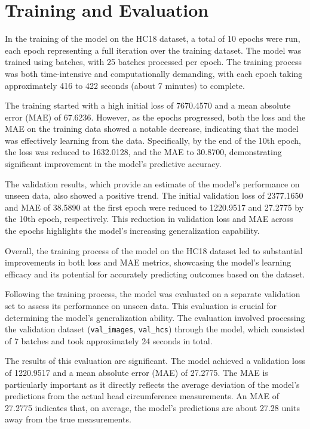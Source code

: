 \documentclass[twocolumn]{article}
\begin{document}
\section{Training and Evaluation}
In the training of the model on the HC18 dataset, a total of 10 epochs were run, each epoch representing a full iteration over the training dataset. The model was trained using batches, with 25 batches processed per epoch. The training process was both time-intensive and computationally demanding, with each epoch taking approximately 416 to 422 seconds (about 7 minutes) to complete.

The training started with a high initial loss of 7670.4570 and a mean absolute error (MAE) of 67.6236. However, as the epochs progressed, both the loss and the MAE on the training data showed a notable decrease, indicating that the model was effectively learning from the data. Specifically, by the end of the 10th epoch, the loss was reduced to 1632.0128, and the MAE to 30.8700, demonstrating significant improvement in the model's predictive accuracy.

The validation results, which provide an estimate of the model's performance on unseen data, also showed a positive trend. The initial validation loss of 2377.1650 and MAE of 38.5890 at the first epoch were reduced to 1220.9517 and 27.2775 by the 10th epoch, respectively. This reduction in validation loss and MAE across the epochs highlights the model's increasing generalization capability.

Overall, the training process of the model on the HC18 dataset led to substantial improvements in both loss and MAE metrics, showcasing the model's learning efficacy and its potential for accurately predicting outcomes based on the dataset.

Following the training process, the model was evaluated on a separate validation set to assess its performance on unseen data. This evaluation is crucial for determining the model's generalization ability. The evaluation involved processing the validation dataset (\texttt{val\_images}, \texttt{val\_hcs}) through the model, which consisted of 7 batches and took approximately 24 seconds in total.

The results of this evaluation are significant. The model achieved a validation loss of 1220.9517 and a mean absolute error (MAE) of 27.2775. The MAE is particularly important as it directly reflects the average deviation of the model's predictions from the actual head circumference measurements. An MAE of 27.2775 indicates that, on average, the model's predictions are about 27.28 units away from the true measurements.
\end{document}
